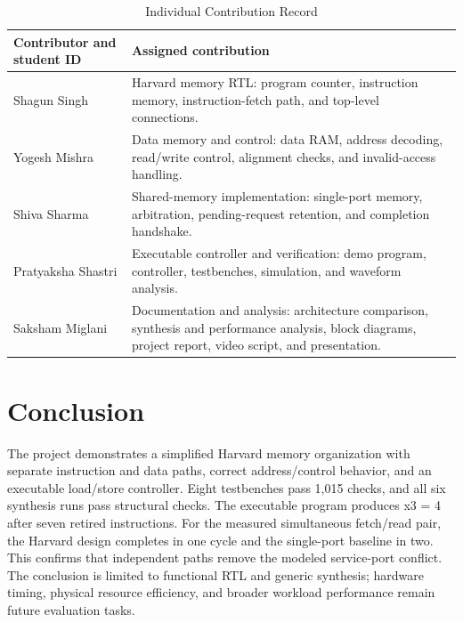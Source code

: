 \documentclass[conference,letterpaper]{IEEEtran}
\begin{document}
\begin{table}[!t]
\caption{Individual Contribution Record}
\label{tab:VI}
\centering\footnotesize
\renewcommand{\arraystretch}{1.15}
\setlength{\tabcolsep}{3pt}
\begin{tabularx}{\columnwidth}{Y Y}
\toprule
\textbf{Contributor and student ID} & \textbf{Assigned contribution} \\
\midrule
Shagun Singh & Harvard memory RTL: program counter, instruction memory, instruction-fetch path, and top-level connections. \\
Yogesh Mishra & Data memory and control: data RAM, address decoding, read/write control, alignment checks, and invalid-access handling. \\
Shiva Sharma & Shared-memory implementation: single-port memory, arbitration, pending-request retention, and completion handshake. \\
Pratyaksha Shastri & Executable controller and verification: demo program, controller, testbenches, simulation, and waveform analysis. \\
Saksham Miglani & Documentation and analysis: architecture comparison, synthesis and performance analysis, block diagrams, project report, video script, and presentation. \\
\bottomrule
\end{tabularx}
\end{table}

\section{Conclusion}

The project demonstrates a simplified Harvard memory organization with separate instruction and data paths, correct address/control behavior, and an executable load/store controller. Eight testbenches pass 1,015 checks, and all six synthesis runs pass structural checks. The executable program produces x3 = 4 after seven retired instructions. For the measured simultaneous fetch/read pair, the Harvard design completes in one cycle and the single-port baseline in two. This confirms that independent paths remove the modeled service-port conflict. The conclusion is limited to functional RTL and generic synthesis; hardware timing, physical resource efficiency, and broader workload performance remain future evaluation tasks.
\end{document}
